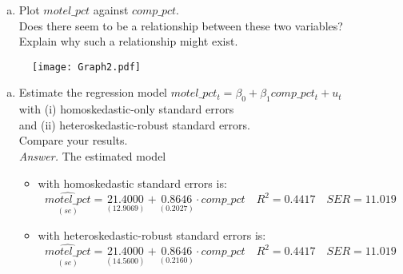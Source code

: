 \documentclass[11pt, xcolor=x11names,compress]{beamer}
\begin{document}
\begin{frame}[fragile,t]
\begin{enumerate}[(b)]
    \item Plot $motel\_pct$ against $comp\_pct$.\\
    Does there seem to be a relationship between these two variables?\\
    Explain why such a relationship might exist.
\end{enumerate}
\pause
\vspace{4mm}
\begin{figure}[h]
    \centering
    \texttt{[image: Graph2.pdf]}
    \caption{}
    \label{fig:my_label}
\end{figure}
\end{frame}

\begin{frame}[fragile,t]
\begin{enumerate}[(c)]
    \item Estimate the regression model $motel\_pct_t = \beta_0 + \beta_1 comp\_pct_t + u_t$\\
    with (i) homoskedastic-only standard errors\\
    and (ii) heteroskedastic-robust standard errors. \\
    Compare your results.\\
    \pause
    \vspace{10mm}
    \textit{Answer.} The estimated model
    \begin{itemize}
        \item with homoskedastic standard errors is:
        $$\underset{(se)}{\widehat{motel\_pct}} = \underset{(12.9069)}{21.4000} +  \underset{(0.2027)}{0.8646} \cdot comp\_pct \quad R^2=0.4417 \quad SER=11.019$$ 
        \item with heteroskedastic-robust standard errors is:
        $$\underset{(se)}{\widehat{motel\_pct}} = \underset{(14.5600)}{21.4000} +  \underset{(0.2160)}{0.8646} \cdot comp\_pct \quad R^2=0.4417 \quad SER=11.019$$ 
    \end{itemize}
\end{enumerate}
\end{frame}
\end{document}
